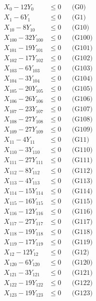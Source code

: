 \documentclass[a4paper,10pt]{article}
\begin{document}
\allowdisplaybreaks
{\small\begin{align}
X_{0} - 12Y_{0} &\leq 0 && \text{(G0)} \\
X_{1} - 6Y_{1} &\leq 0 && \text{(G1)} \\
X_{10} - 8Y_{10} &\leq 0 && \text{(G10)} \\
X_{100} - 32Y_{100} &\leq 0 && \text{(G100)} \\
X_{101} - 19Y_{101} &\leq 0 && \text{(G101)} \\
X_{102} - 17Y_{102} &\leq 0 && \text{(G102)} \\
X_{103} - 6Y_{103} &\leq 0 && \text{(G103)} \\
X_{104} - 3Y_{104} &\leq 0 && \text{(G104)} \\
X_{105} - 20Y_{105} &\leq 0 && \text{(G105)} \\
X_{106} - 26Y_{106} &\leq 0 && \text{(G106)} \\
X_{107} - 23Y_{107} &\leq 0 && \text{(G107)} \\
X_{108} - 27Y_{108} &\leq 0 && \text{(G108)} \\
X_{109} - 27Y_{109} &\leq 0 && \text{(G109)} \\
X_{11} - 4Y_{11} &\leq 0 && \text{(G11)} \\
X_{110} - 3Y_{110} &\leq 0 && \text{(G110)} \\
X_{111} - 27Y_{111} &\leq 0 && \text{(G111)} \\
X_{112} - 8Y_{112} &\leq 0 && \text{(G112)} \\
X_{113} - 4Y_{113} &\leq 0 && \text{(G113)} \\
X_{114} - 15Y_{114} &\leq 0 && \text{(G114)} \\
X_{115} - 16Y_{115} &\leq 0 && \text{(G115)} \\
\allowbreak
X_{116} - 12Y_{116} &\leq 0 && \text{(G116)} \\
X_{117} - 27Y_{117} &\leq 0 && \text{(G117)} \\
X_{118} - 19Y_{118} &\leq 0 && \text{(G118)} \\
X_{119} - 17Y_{119} &\leq 0 && \text{(G119)} \\
X_{12} - 12Y_{12} &\leq 0 && \text{(G12)} \\
X_{120} - 6Y_{120} &\leq 0 && \text{(G120)} \\
X_{121} - 3Y_{121} &\leq 0 && \text{(G121)} \\
X_{122} - 19Y_{122} &\leq 0 && \text{(G122)} \\
X_{123} - 19Y_{123} &\leq 0 && \text{(G123)} \\

\end{align}}
\end{document}
